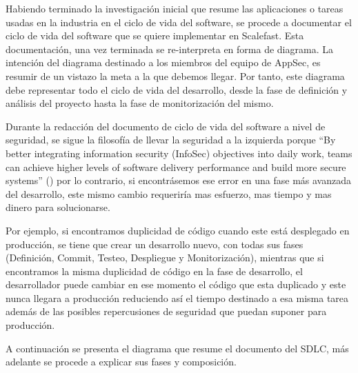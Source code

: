 \documentclass[12pt]{report} %
\begin{document}

Habiendo terminado la investigación inicial que resume las aplicaciones o tareas
usadas en la industria en el ciclo de vida del software, se procede a documentar
el ciclo de vida del software que se quiere implementar en Scalefast.
Esta documentación, una vez terminada se re-interpreta en forma de diagrama.
La intención del diagrama destinado a los miembros del equipo de
\acrfull{AppSec}, es resumir de un vistazo la meta a la que debemos llegar.
Por tanto, este diagrama debe representar todo el ciclo de vida del desarrollo,
desde la fase de definición y análisis del proyecto hasta la fase de
monitorización del mismo.
 
Durante la redacción del documento de ciclo de vida del software a nivel de
seguridad, se sigue la filosofía de llevar la seguridad a la izquierda porque
``By better integrating information security (InfoSec) objectives into daily
work, teams can achieve higher levels of software delivery performance and build
more secure systems'' (\cite{GoogleDOT})
por lo contrario, si encontrásemos ese error en una fase más avanzada del
desarrollo, este mismo cambio requeriría mas esfuerzo, mas tiempo y mas dinero
para solucionarse.

Por ejemplo, si encontramos duplicidad de código cuando este está desplegado en
producción, se tiene que crear un desarrollo nuevo, con todas sus fases
(Definición, Commit, Testeo, Despliegue y Monitorización), mientras que si
encontramos la misma duplicidad de código en la fase de desarrollo, el
desarrollador puede cambiar en ese momento el código que esta duplicado y este
nunca llegara a producción reduciendo así el tiempo destinado a esa misma tarea
además de las posibles repercusiones de seguridad que puedan suponer para
producción. 

A continuación se presenta el diagrama que resume el documento del \gls{SDLC},
más adelante se procede a explicar sus fases y composición.
\end{document}
